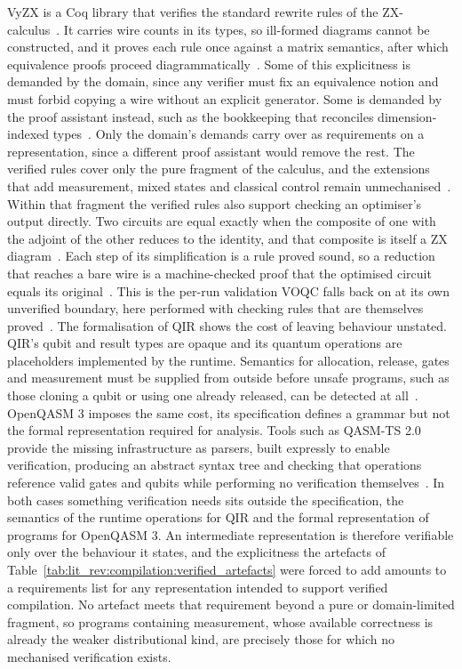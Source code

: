 VyZX is a Coq library that verifies the standard rewrite rules of the ZX-calculus~\cite{caldwell2026vyzx}.
It carries wire counts in its types, so ill-formed diagrams cannot be constructed, and it proves each rule once against a matrix semantics, after which equivalence proofs proceed diagrammatically~\cite{caldwell2026vyzx}.
Some of this explicitness is demanded by the domain, since any verifier must fix an equivalence notion and must forbid copying a wire without an explicit generator.
Some is demanded by the proof assistant instead, such as the bookkeeping that reconciles dimension-indexed types~\cite{caldwell2026vyzx}.
Only the domain's demands carry over as requirements on a representation, since a different proof assistant would remove the rest.
The verified rules cover only the pure fragment of the calculus, and the extensions that add measurement, mixed states and classical control remain unmechanised~\cite{zxworkingquantumscientist2020}.
Within that fragment the verified rules also support checking an optimiser's output directly.
Two circuits are equal exactly when the composite of one with the adjoint of the other reduces to the identity, and that composite is itself a ZX diagram~\cite{reducingtcount2019}.
Each step of its simplification is a rule proved sound, so a reduction that reaches a bare wire is a machine-checked proof that the optimised circuit equals its original~\cite{reducingtcount2019}.
This is the per-run validation VOQC falls back on at its own unverified boundary, here performed with checking rules that are themselves proved~\cite{hietala2023voqc}.
The formalisation of QIR shows the cost of leaving behaviour unstated.
QIR's qubit and result types are opaque and its quantum operations are placeholders implemented by the runtime.
Semantics for allocation, release, gates and measurement must be supplied from outside before unsafe programs, such as those cloning a qubit or using one already released, can be detected at all~\cite{qirformalization2024}.
OpenQASM 3 imposes the same cost, its specification defines a grammar but not the formal representation required for analysis.
Tools such as QASM-TS 2.0 provide the missing infrastructure as parsers, built expressly to enable verification, producing an abstract syntax tree and checking that operations reference valid gates and qubits while performing no verification themselves~\cite{openqasmts2024}.
In both cases something verification needs sits outside the specification, the semantics of the runtime operations for QIR and the formal representation of programs for OpenQASM 3.
An intermediate representation is therefore verifiable only over the behaviour it states, and the explicitness the artefacts of Table~\ref{tab:lit_rev:compilation:verified_artefacts} were forced to add amounts to a requirements list for any representation intended to support verified compilation.
No artefact meets that requirement beyond a pure or domain-limited fragment, so programs containing measurement, whose available correctness is already the weaker distributional kind, are precisely those for which no mechanised verification exists.

